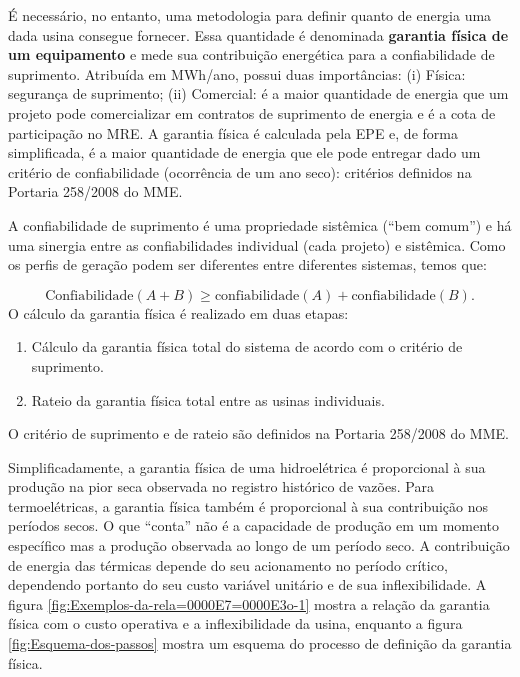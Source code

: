 É necessário, no entanto, uma metodologia para definir quanto de energia
uma dada usina consegue fornecer. Essa quantidade é denominada \textbf{garantia
física de um equipamento} e mede sua contribuição energética para
a confiabilidade de suprimento. Atribuída em MWh/ano, possui duas
importâncias: (i) Física: segurança de suprimento; (ii) Comercial:
é a maior quantidade de energia que um projeto pode comercializar
em contratos de suprimento de energia e é a cota de participação no
MRE. A garantia física é calculada pela EPE e, de forma simplificada,
é a maior quantidade de energia que ele pode entregar dado um critério
de confiabilidade (ocorrência de um ano seco): critérios definidos
na Portaria 258/2008 do MME.

A confiabilidade de suprimento é uma propriedade sistêmica (\textquotedblleft bem
comum\textquotedblright ) e há uma sinergia entre as confiabilidades
individual (cada projeto) e sistêmica. Como os perfis de geração podem
ser diferentes entre diferentes sistemas, temos que:

\[
\mbox{Confiabilidade}(A+B)\geq\mbox{confiabilidade}(A)+\mbox{confiabilidade}(B).
\]
O cálculo da garantia física é realizado em duas etapas: 
\begin{enumerate}
\item Cálculo da garantia física total do sistema de acordo com o critério
de suprimento.
\item Rateio da garantia física total entre as usinas individuais. 
\end{enumerate}
O critério de suprimento e de rateio são definidos na Portaria 258/2008
do MME.

Simplificadamente, a garantia física de uma hidroelétrica é proporcional
à sua produção na pior seca observada no registro histórico de vazões.
Para termoelétricas, a garantia física também é proporcional à sua
contribuição nos períodos secos. O que \textquotedblleft conta\textquotedblright{}
não é a capacidade de produção em um momento específico mas a produção
observada ao longo de um período seco. A contribuição de energia das
térmicas depende do seu acionamento no período crítico, dependendo
portanto do seu custo variável unitário e de sua inflexibilidade.
A figura \ref{fig:Exemplos-da-rela=0000E7=0000E3o-1} mostra a relação
da garantia física com o custo operativa e a inflexibilidade da usina,
enquanto a figura \ref{fig:Esquema-dos-passos} mostra um esquema
do processo de definição da garantia física.

